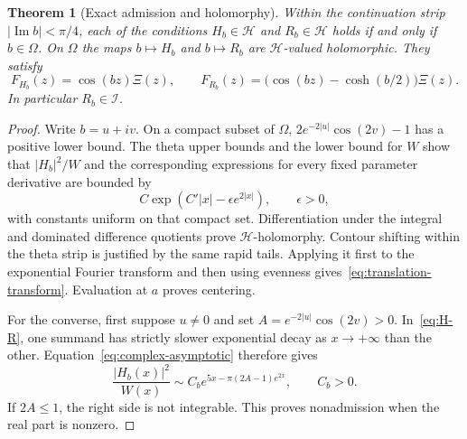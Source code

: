\documentclass[11pt,a4paper]{article}
\numberwithin{equation}{section}
\newtheorem{theorem}{Theorem}[section]
\theoremstyle{definition}
\theoremstyle{remark}
\newcommand{\Hh}{\mathcal H}
\newcommand{\Ii}{\mathcal I}
\begin{document}
\begin{theorem}[Exact admission and holomorphy]\label{thm:lens}
Within the continuation strip $|\operatorname{Im}b|<\pi/4$, each of the conditions $H_b\in\Hh$ and $R_b\in\Hh$ holds if and only if $b\in\Omega$. On $\Omega$ the maps $b\mapsto H_b$ and $b\mapsto R_b$ are $\Hh$-valued holomorphic. They satisfy
\begin{equation}\label{eq:translation-transform}
 F_{H_b}(z)=\cos(bz)\Xi(z),\qquad
 F_{R_b}(z)=\bigl(\cos(bz)-\cosh(b/2)\bigr)\Xi(z).
\end{equation}
In particular $R_b\in\Ii$.
\end{theorem}
\begin{proof}
Write $b=u+iv$. On a compact subset of $\Omega$,
$2e^{-2|u|}\cos(2v)-1$ has a positive lower bound. The theta upper bounds and the lower bound for $W$ show that $|H_b|^2/W$ and the corresponding expressions for every fixed parameter derivative are bounded by
\begin{equation}\label{eq:lens-majorant}
 C\exp(C'|x|-\epsilon e^{2|x|}),\qquad \epsilon>0,
\end{equation}
with constants uniform on that compact set. Differentiation under the integral and dominated difference quotients prove $\Hh$-holomorphy. Contour shifting within the theta strip is justified by the same rapid tails. Applying it first to the exponential Fourier transform and then using evenness gives~\eqref{eq:translation-transform}. Evaluation at $a$ proves centering.

For the converse, first suppose $u\ne0$ and set $A=e^{-2|u|}\cos(2v)>0$. In~\eqref{eq:H-R}, one summand has strictly slower exponential decay as $x\to+\infty$ than the other. Equation~\eqref{eq:complex-asymptotic} therefore gives
\begin{equation}\label{eq:nonadmission-u}
 \frac{|H_b(x)|^2}{W(x)}
 \sim C_b e^{5x-\pi(2A-1)e^{2x}},\qquad C_b>0.
\end{equation}
If $2A\le1$, the right side is not integrable. This proves nonadmission when the real part is nonzero.


\end{proof}
\end{document}
